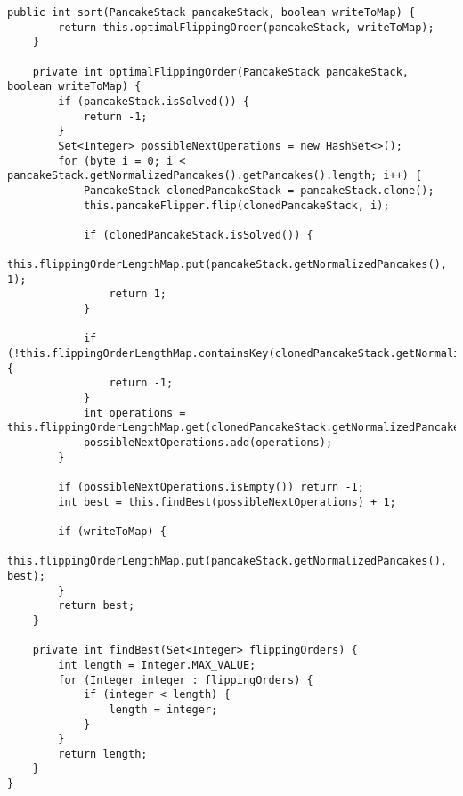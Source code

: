 \begin{lstlisting}[label={lst:source}]
    public int sort(PancakeStack pancakeStack, boolean writeToMap) {
        return this.optimalFlippingOrder(pancakeStack, writeToMap);
    }

    private int optimalFlippingOrder(PancakeStack pancakeStack, boolean writeToMap) {
        if (pancakeStack.isSolved()) {
            return -1;
        }
        Set<Integer> possibleNextOperations = new HashSet<>();
        for (byte i = 0; i < pancakeStack.getNormalizedPancakes().getPancakes().length; i++) {
            PancakeStack clonedPancakeStack = pancakeStack.clone();
            this.pancakeFlipper.flip(clonedPancakeStack, i);

            if (clonedPancakeStack.isSolved()) {
                this.flippingOrderLengthMap.put(pancakeStack.getNormalizedPancakes(), 1);
                return 1;
            }

            if (!this.flippingOrderLengthMap.containsKey(clonedPancakeStack.getNormalizedPancakes())) {
                return -1;
            }
            int operations = this.flippingOrderLengthMap.get(clonedPancakeStack.getNormalizedPancakes());
            possibleNextOperations.add(operations);
        }

        if (possibleNextOperations.isEmpty()) return -1;
        int best = this.findBest(possibleNextOperations) + 1;

        if (writeToMap) {
            this.flippingOrderLengthMap.put(pancakeStack.getNormalizedPancakes(), best);
        }
        return best;
    }

    private int findBest(Set<Integer> flippingOrders) {
        int length = Integer.MAX_VALUE;
        for (Integer integer : flippingOrders) {
            if (integer < length) {
                length = integer;
            }
        }
        return length;
    }
}


\end{lstlisting}
